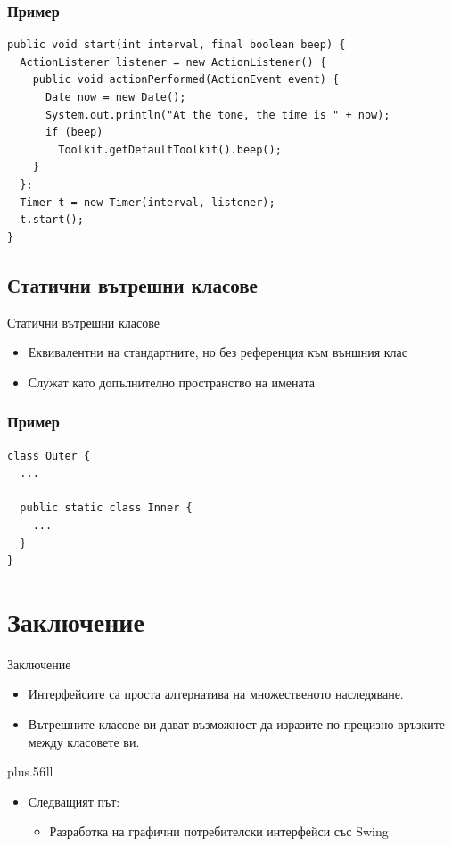 \documentclass{beamer}
\begin{document}
\begin{frame}[fragile]
  \frametitle{Пример}
  
\begin{lstlisting}[basicstyle=\small]
public void start(int interval, final boolean beep) {
  ActionListener listener = new ActionListener() {
    public void actionPerformed(ActionEvent event) {
      Date now = new Date();
      System.out.println("At the tone, the time is " + now);
      if (beep) 
        Toolkit.getDefaultToolkit().beep();
    }
  };
  Timer t = new Timer(interval, listener);
  t.start();
} 
\end{lstlisting}
\end{frame}

\subsection{Статични вътрешни класове}
\begin{frame}{Статични вътрешни класове}
  
  \begin{itemize}
  \item Еквивалентни на стандартните, но без референция към външния
    клас  
  \item Служат като допълнително пространство на имената
  \end{itemize}
\end{frame}

\begin{frame}[fragile]
  \frametitle{Пример}
  
\begin{lstlisting}
class Outer {
  ...

  public static class Inner {
    ...
  }
}  
\end{lstlisting}
\end{frame}

\section*{Заключение}
\begin{frame}{Заключение}
  
  \begin{itemize}
  \item
    Интерфейсите са проста алтернатива на множественото наследяване.
  \item
    Вътрешните класове ви дават възможност да изразите по-прецизно
    връзките между класовете ви.
  \end{itemize}
  
  \vskip0pt plus.5fill
  \begin{itemize}
  \item
    Следващият път:
    \begin{itemize}
    \item
      Разработка на графични потребителски интерфейси със Swing
    \end{itemize}
  \end{itemize}
\end{frame}
\end{document}
